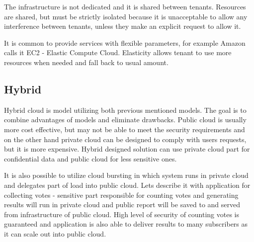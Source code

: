 The infrastructure is not dedicated and it is shared between tenants. Resources are shared, but must be strictly isolated because it is unacceptable to allow any interference between tenants, unless they make an explicit request to allow it.

It is common to provide services with flexible parameters, for example Amazon calls it EC2 - Elastic Compute Cloud. Elasticity allows tenant to use more resources when needed and fall back to usual amount. 

\subsection{Hybrid}
Hybrid cloud is model utilizing both previous mentioned models. The goal is to combine advantages of models and eliminate drawbacks. Public cloud is usually more cost effective, but may not be able to meet the security requirements and on the other hand private cloud can be designed to comply with users requests, but it is more expensive. Hybrid designed solution can use private cloud part for confidential data and public cloud for less sensitive ones. 

It is also possible to utilize cloud bursting in which system runs in private cloud and delegates part of load into public cloud. Lets describe it with application for collecting votes - sensitive part responsible for counting votes and generating results will run in private cloud and public report will be saved to and served from infrastructure of public cloud. High level of security of counting votes is guaranteed and application is also able to deliver results to many subscribers as it can scale out into public cloud.

